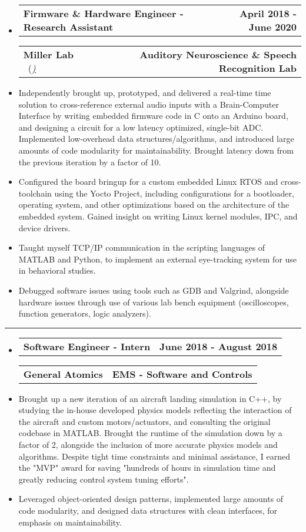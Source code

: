 \documentclass[10pt,letterpaper]{article}
\makeatletter
\newcommand{\header}[2]
{
	\begin{tabular*}{\linewidth}{l @{\extracolsep{\fill}} r}
		\hspace{-27pt} #1 & #2 \\
	\end{tabular*}
}
\makeatother
\begin{document}
\begin{itemize}
	\item[]
		\header
		{\textbf{Firmware \& Hardware Engineer - Research Assistant}} 
		{\textbf{April 2018 - June 2020}}
		\header
		{\textbf{Miller Lab} \ (\href{https://millerlab.faculty.ucdavis.edu}{\small \emph{\underline{\smash{millerlab.faculty.ucdavis.edu})}}} }
		{\textbf{Auditory Neuroscience \& Speech Recognition Lab}} 
	\item
		Independently brought up, prototyped, and delivered a real-time time solution to cross-reference external audio inputs with a Brain-Computer Interface by writing embedded firmware code in C onto an Arduino board, and designing a circuit for a low latency optimized, single-bit ADC. Implemented low-overhead data structures/algorithms, and introduced large amounts of code modularity for maintainability. Brought latency down from the previous iteration by a factor of 10.
	\item 
		Configured the board bringup for a custom embedded Linux RTOS and cross-toolchain using the Yocto Project, including configurations for a bootloader, operating system, and other optimizations based on the architecture of the embedded system. Gained insight on writing Linux kernel modules, IPC, and device drivers.
	\item 
		Taught myself TCP/IP communication in the scripting languages of MATLAB and Python, to implement an external eye-tracking system for use in behavioral studies.
	\item 
		Debugged software issues using tools such as GDB and Valgrind, alongside hardware issues through use of various lab bench equipment (oscilloscopes, function generators, logic analyzers).
\end{itemize}

\hrule

\begin{itemize}
	\item[]
		\header
		{\textbf{Software Engineer - Intern}} 
		{\textbf{June 2018 - August 2018}}
		\header
		{\textbf{General Atomics}}
		{\textbf{EMS - Software and Controls}} 
	\item
		Brought up a new iteration of an aircraft landing simulation in C++, by studying the in-house developed physics models reflecting the interaction of the aircraft and custom motors/actuators, and consulting the original codebase in MATLAB. Brought the runtime of the simulation down by a factor of 2, alongside the inclusion of more accurate physics models and algorithms. Despite tight time constraints and minimal assistance, I earned the "MVP" award for saving "hundreds of hours in simulation time and greatly reducing control system tuning efforts". 

	\item
		Leveraged object-oriented design patterns, implemented large amounts of code modularity, and designed data structures with clean interfaces, for emphasis on maintainability.


\end{itemize}
\end{document}
